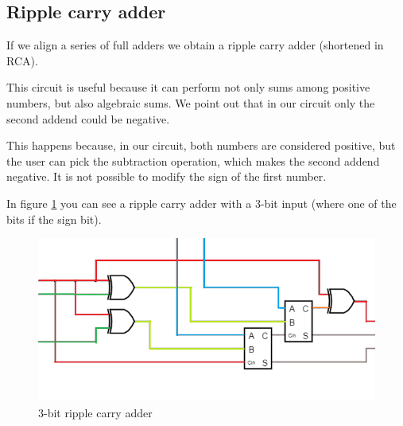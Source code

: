 \documentclass{article}
\begin{document}
\subsection{Ripple carry adder} \label{RCA_Section}

If we align a series of full adders we obtain a ripple carry adder (shortened in RCA).

\vspace{3mm}

This circuit is useful because it can perform not only sums among positive numbers, but also algebraic sums. We point out that in our circuit only the second addend could be negative.

\vspace{3mm}

This happens because, in our circuit, both numbers are considered positive, but the user can pick the subtraction operation, which makes the second addend negative. It is not possible to modify the sign of the first number.

\vspace{3mm}

In figure \ref{RCA_SMALL} you can see a ripple carry adder with a 3-bit input (where one of the bits if the sign bit).

\begin{figure}[h]
  \centering
  \includegraphics[scale=.65]{IM_RCA_SMALL.PNG}
  \caption{3-bit ripple carry adder}
  \label{RCA_SMALL}
\end{figure}
\end{document}
